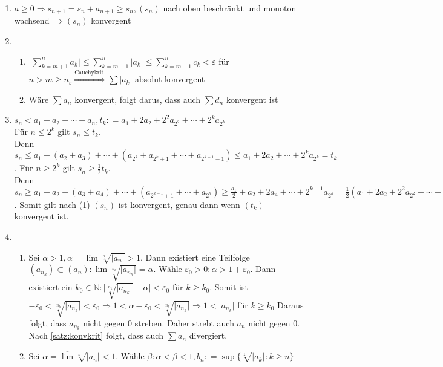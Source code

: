 \documentclass[ngerman,titlepage,twoside, parskip=half*]{scrreprt}
\newcommand*{\N}{\mathbb{N}}
\theoremstyle{plain}
\theoremstyle{definition}
\theoremstyle{remark}
\newcommand*{\abs}[2][]{#1\lvert#2#1\rvert}
\newcommand*{\coloneqq}{\mathrel{\mathop:}=}
\begin{document}
\begin{enumerate}[(1)]
  \item $a\geq 0 \Rightarrow s_{n+1}=s_n+a_{n+1} \geq s_n, (s_n)$ nach oben beschränkt und monoton wachsend $\Rightarrow (s_n)$
    konvergent
  \item
    \begin{enumerate}[1)]
      \item $\abs{\sum_{k=m+1}^n a_k}\leq \sum_{k=m+1}^n \abs{a_k}\leq \sum_{k=m+1}^n c_k <\varepsilon$ für $n>m\geq n_{\varepsilon}
        \stackrel{\text{Cauchykrit.}}{\Longrightarrow} \sum \abs{a_k}$ absolut konvergent
      \item Wäre $\sum a_n$ konvergent, folgt darus, dass auch $\sum d_n$ konvergent ist
    \end{enumerate}
  \item $s_n<a_1+a_2+\cdots +a_n, t_k\coloneqq a_1+2a_2+2^2a_{2^2}+\cdots +2^ka_{2^k}$\\
    Für $n\leq 2^k$ gilt $s_n\leq t_k$.\\
    Denn $s_n\leq a_1+(a_2+a_3)+\cdots +(a_{2^k}+a_{2^k+1}+\cdots +a_{2^{k+1}-1})\leq
    a_1+2a_2+\cdots +2^ka_{2^k}=t_k$. Für $n\geq 2^k$ gilt $s_n\geq \frac{1}{2}t_k$.\\
    Denn $s_n\geq a_1 + a_2+(a_3+a_4)+\cdots +(a_{2^{k-1}+1}+\cdots +a_{2^k})\geq \frac{a_1}{2}+a_2+2a_4+\cdots +2^{k-1}
    a_{2^k}=\frac{1}{2}(a_1+2a_2+2^2a_{2^2}+\cdots +2^ka_{2^k})=\frac{1}{2}t_k$. Somit gilt nach (1) $(s_n)$ ist
    konvergent, genau dann wenn $(t_k)$ konvergent ist.
  \item
    \begin{enumerate}[1. F{a}ll]
      \item Sei $\alpha >1, \alpha=\overline{\lim}\sqrt[n]{\abs{a_n}}>1$. Dann existiert eine Teilfolge $(a_{n_k}) \subset (a_n)\colon
        \lim \sqrt[n_k]{\abs{a_{n_k}}}=\alpha$. Wähle $\varepsilon_0>0\colon\alpha >1+\varepsilon_0$. Dann existiert ein $k_0 \in \N \colon
	\abs{\sqrt[n_k]{\abs{a_{n_k}}} -\alpha }<\varepsilon_0$ für
        $k\geq k_0$. Somit ist $-\varepsilon_0 <\sqrt[n_k]{\abs{a_{n_k}}}< 
	\varepsilon_0 \Rightarrow 1<\alpha-\varepsilon_0<\sqrt[n_k]{\abs{a_{n_k}}}\Rightarrow 1<\abs{a_{n_k}}$ für $k\geq k_0$
	Daraus folgt, dass $a_{n_k}$ nicht gegen 0 streben. Daher strebt auch $a_n$ nicht gegen 0. Nach \autoref{satz:konvkrit}
	folgt, dass auch $\sum a_n$ divergiert.
      \item Sei $\alpha =\overline{\lim}\sqrt[n]{\abs{a_n}}<1$. Wähle $\beta \colon\alpha<\beta <1, b_n\coloneqq\sup\{\sqrt[k]{\abs{a_k}}\colon k\geq n\}$

\end{enumerate}
\end{enumerate}
\end{document}
